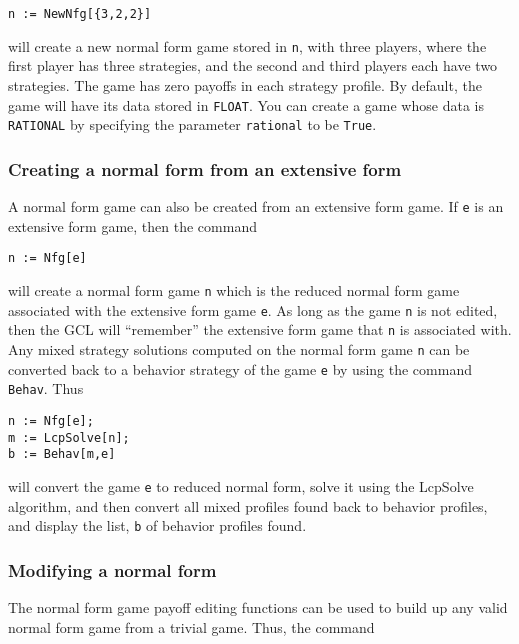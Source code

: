 \begin{verbatim}
n := NewNfg[{3,2,2}]
\end{verbatim}

\noindent 
will create a new normal form game stored in \verb+n+, with three players, where
the first player has three strategies, and the second and third
players each have two strategies.  The game has zero payoffs in each
strategy profile.  By default, the game will have its data stored in
\verb+FLOAT+.  You can create a game whose data is \verb+RATIONAL+
by specifying the parameter \verb+rational+ to be \verb+True+.

\subsubsection{Creating a normal form from an extensive form}

A normal form game can also be created from an extensive form game.
If \verb+e+ is an extensive form game, then the command 

\begin{verbatim}
n := Nfg[e]
\end{verbatim}

\noindent
will create a normal form game \verb+n+ which is the reduced normal
form game associated with the extensive form game \verb+e+.  As long
as the game \verb+n+ is not edited, then the GCL will ``remember'' the
extensive form game that \verb+n+ is associated with.  Any mixed
strategy solutions computed on the normal form game \verb+n+ can be
converted back to a behavior strategy of the game \verb+e+ by using
the command \verb+Behav+.  Thus

\begin{verbatim}
n := Nfg[e];
m := LcpSolve[n];
b := Behav[m,e]
\end{verbatim}

\noindent
will convert the game \verb+e+ to reduced normal form, solve it using
the LcpSolve algorithm, and then convert all mixed profiles found back
to behavior profiles, and display the list, \verb+b+ of behavior
profiles found. 
  
\subsubsection{Modifying a normal form}

The normal form game payoff editing functions can be used to build up any
valid normal form game from a trivial game.  Thus, the command

